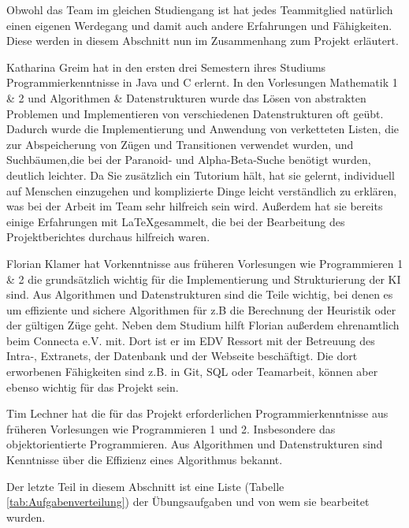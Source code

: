 \documentclass[12pt,a4paper,bibliography=totocnumbered,listof=totocnumbered]{scrartcl}
\begin{document}
    Obwohl das Team im gleichen Studiengang ist hat jedes Teammitglied natürlich einen eigenen Werdegang und damit auch andere Erfahrungen und Fähigkeiten. Diese werden in diesem Abschnitt nun im Zusammenhang zum Projekt erläutert.

    Katharina Greim hat in den ersten drei Semestern ihres Studiums Programmierkenntnisse in Java und C erlernt. In den Vorlesungen Mathematik 1 \& 2 und Algorithmen \& Datenstrukturen wurde das Lösen von abstrakten Problemen und Implementieren von verschiedenen Datenstrukturen oft geübt. Dadurch wurde die Implementierung und Anwendung von verketteten Listen, die zur Abspeicherung von Zügen und Transitionen verwendet wurden, und Suchbäumen,die bei der Paranoid- und Alpha-Beta-Suche benötigt wurden, deutlich leichter. Da Sie zusätzlich ein Tutorium hält, hat sie gelernt, individuell auf Menschen einzugehen und komplizierte Dinge leicht verständlich zu erklären, was bei der Arbeit im Team sehr hilfreich sein wird. Außerdem hat sie bereits einige Erfahrungen mit \LaTeX\quad gesammelt, die bei der Bearbeitung des Projektberichtes durchaus hilfreich waren.

    Florian Klamer hat Vorkenntnisse aus früheren Vorlesungen wie Programmieren 1 \& 2 die grundsätzlich wichtig für die Implementierung und Strukturierung der KI sind. Aus Algorithmen und Datenstrukturen sind die Teile wichtig, bei denen es um effiziente und sichere Algorithmen für z.B die Berechnung der Heuristik oder der gültigen Züge geht. Neben dem Studium hilft Florian außerdem ehrenamtlich beim Connecta e.V. mit. Dort ist er im EDV Ressort mit der Betreuung des Intra-, Extranets, der Datenbank und der Webseite beschäftigt. Die dort erworbenen Fähigkeiten sind z.B. in Git, SQL oder Teamarbeit, können aber ebenso wichtig für das Projekt sein.

	Tim Lechner hat die für das Projekt erforderlichen Programmierkenntnisse aus früheren Vorlesungen wie Programmieren 1 und 2. Insbesondere das objektorientierte Programmieren. Aus Algorithmen und Datenstrukturen sind Kenntnisse über die Effizienz eines Algorithmus bekannt.  
    

    Der letzte Teil in diesem Abschnitt ist eine Liste (Tabelle \ref{tab:Aufgabenverteilung}) der Übungsaufgaben und von wem sie bearbeitet wurden.\newline
\end{document}
